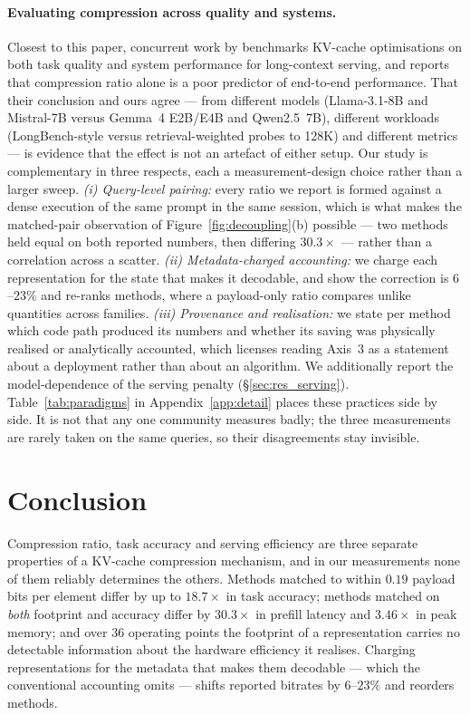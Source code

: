 \documentclass[sigplan,10pt,anonymous,review,nonacm]{acmart}
\begin{document}
\paragraph{Evaluating compression across quality and systems.}
Closest to this paper, concurrent work by \citet{agrawal2026benchmarking}
benchmarks KV-cache optimisations on both task quality and system performance
for long-context serving, and reports that compression ratio alone is a poor
predictor of end-to-end performance. That their conclusion and ours agree ---
from different models (Llama-3.1-8B and Mistral-7B versus Gemma~4 E2B/E4B and
Qwen2.5~7B), different workloads (LongBench-style versus retrieval-weighted
probes to 128K) and different metrics --- is evidence that the effect is not
an artefact of either setup. Our study is complementary in three respects,
each a measurement-design choice rather than a larger sweep.
\emph{(i) Query-level pairing:} every ratio we report is formed against a
dense execution of the same prompt in the same session, which is what makes
the matched-pair observation of Figure~\ref{fig:decoupling}(b) possible ---
two methods held equal on both reported numbers, then differing $30.3\times$
--- rather than a correlation across a scatter.
\emph{(ii) Metadata-charged accounting:} we charge each representation for the
state that makes it decodable, and show the correction is $6$--$23\%$ and
re-ranks methods, where a payload-only ratio compares unlike quantities across
families.
\emph{(iii) Provenance and realisation:} we state per method which code path
produced its numbers and whether its saving was physically realised or
analytically accounted, which licenses reading Axis~3 as a statement about a
deployment rather than about an algorithm. We additionally report the
model-dependence of the serving penalty (\S\ref{sec:res_serving}).
Table~\ref{tab:paradigms} in Appendix~\ref{app:detail} places these practices
side by side. It is not that any one community measures badly; the three
measurements are rarely taken on the same queries, so their disagreements stay
invisible.


\section{Conclusion}
\label{sec:conclusion}

Compression ratio, task accuracy and serving efficiency are three separate
properties of a KV-cache compression mechanism, and in our measurements none
of them reliably determines the others. Methods matched to within $0.19$
payload bits per element differ by up to $18.7\times$ in task accuracy;
methods matched on \emph{both} footprint and accuracy differ by $30.3\times$
in prefill latency and $3.46\times$ in peak memory; and over $36$ operating
points the footprint of a representation carries no detectable information
about the hardware efficiency it realises. Charging representations for the
metadata that makes them decodable --- which the conventional accounting omits
--- shifts reported bitrates by $6$--$23\%$ and reorders methods.
\end{document}

